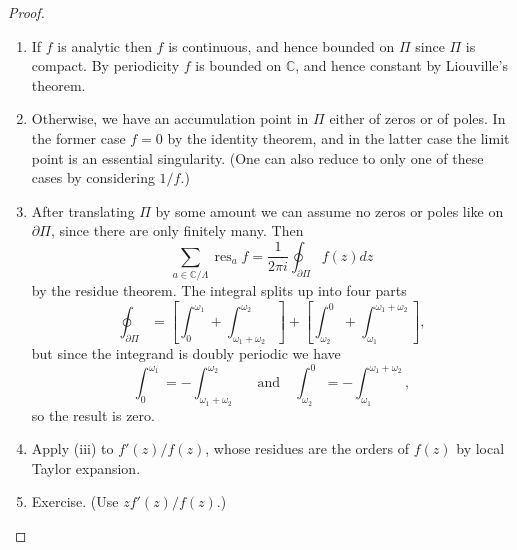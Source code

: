 \documentclass[a4paper]{article}
\theoremstyle{definition}
\DeclareMathOperator{\res}{res}
\newcommand{\C}{\mathbb{C}}
\begin{document}
\begin{proof}
    \begin{enumerate}[label=(\roman*)]
        \item If $f$ is analytic then $f$ is continuous, and hence bounded on
            $\Pi$ since $\Pi$ is compact. By periodicity $f$ is bounded on $\C$,
            and hence constant by Liouville's theorem.

        \item Otherwise, we have an accumulation point in $\Pi$ either of zeros
            or of poles. In the former case $f=0$ by the identity theorem, and
            in the latter case the limit point is an essential singularity. (One
            can also reduce to only one of these cases by considering $1/f$.)

        \item After translating $\Pi$ by some amount we can assume no zeros or
            poles like on $\partial\Pi$, since there are only finitely many.
            Then
            \begin{equation*}
                \sum_{a\in\C/\Lambda}\res_af
                    = \frac{1}{2\pi i}\oint_{\partial\Pi}f(z)dz
            \end{equation*}
            by the residue theorem. The integral splits up into four parts
            \begin{equation*}
                \oint_{\partial\Pi}
                    = \left[\int_0^{\omega_1}
                        + \int_{\omega_1+\omega_2}^{\omega_2}\right]
                    + \left[\int_{\omega_2}^0
                        + \int_{\omega_1}^{\omega_1+\omega_2}\right],
            \end{equation*}
            but since the integrand is doubly periodic we have
            \begin{equation*}
                \int_0^{\omega_1} = -\int_{\omega_1+\omega_2}^{\omega_2}
                \quad \text{and} \quad
                \int_{\omega_2}^0 = -\int_{\omega_1}^{\omega_1+\omega_2},
            \end{equation*}
            so the result is zero.

        \item Apply (iii) to $f'(z)/f(z)$, whose residues are the orders of
            $f(z)$ by local Taylor expansion.

        \item Exercise. (Use $zf'(z)/f(z)$.)
    \end{enumerate}
\end{proof}
\end{document}
